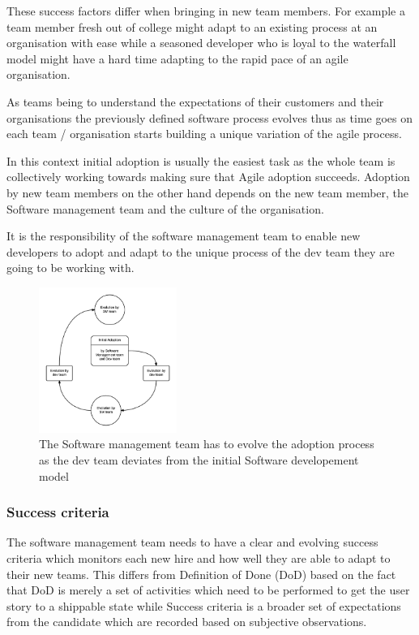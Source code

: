 \documentclass[12pt,conference]{IEEEtran}
\begin{document}
These success factors differ when bringing in new team members. For example a team member fresh out of college might adapt to an existing process at an organisation with ease while a seasoned developer who is loyal to the waterfall model might have a hard time adapting to the rapid pace of an agile organisation. 

As teams being to understand the expectations of their customers and their organisations the previously defined software process evolves thus as time goes on each team / organisation starts building a unique variation of the agile process.

In this context initial adoption is usually the easiest task as the whole team is collectively working towards making sure that Agile adoption succeeds. Adoption by new team members on the other hand depends on the new team member, the Software management team and the culture of the organisation.

It is the responsibility of the software management team to enable new developers to adopt and adapt to the unique process of the dev team they are going to be working with.

\begin{figure}[t]
\centering
\includegraphics[width=0.4\textwidth]{sm_dev_team_process_evolution.png}
\caption{The Software management team has to evolve the adoption process as the dev team deviates from the initial Software developement model}
\end{figure}



\subsubsection*{Success criteria} The software management team needs to have a clear and evolving success criteria which monitors each new hire and how well they are able to adapt to their new teams. This differs from Definition of Done (DoD) based on the fact that DoD is merely a set of activities which need to be performed to get the user story to a shippable state while Success criteria is a broader set of expectations from the candidate which are recorded based on subjective observations. 
\end{document}
